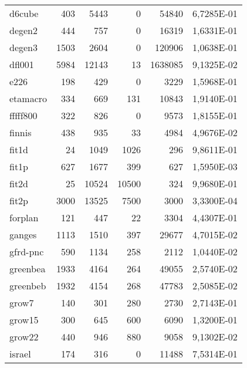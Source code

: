 {\begin{longtable}{>{\ttfamily}lrrrrc}
d6cube       		& 403       & 5443      & 0           & 54840    & \num{6,7285E-01} \\
degen2       		& 444       & 757       & 0           & 16319    & \num{1,6331E-01} \\
degen3       		& 1503      & 2604      & 0           & 120906   & \num{1,0638E-01} \\
dfl001       		& 5984      & 12143     & 13          & 1638085  & \num{9,1325E-02} \\
e226         		& 198       & 429       & 0           & 3229     & \num{1,5968E-01} \\
etamacro     		& 334       & 669       & 131         & 10843    & \num{1,9140E-01} \\
fffff800     		& 322       & 826       & 0           & 9573     & \num{1,8155E-01} \\
finnis       		& 438       & 935       & 33          & 4984     & \num{4,9676E-02} \\
fit1d        		& 24        & 1049      & 1026        & 296      & \num{9,8611E-01} \\
fit1p        		& 627       & 1677      & 399         & 627      & \num{1,5950E-03} \\
fit2d        		& 25        & 10524     & 10500       & 324      & \num{9,9680E-01} \\
fit2p        		& 3000      & 13525     & 7500        & 3000     & \num{3,3300E-04} \\
forplan      		& 121       & 447       & 22          & 3304     & \num{4,4307E-01} \\
ganges       		& 1113      & 1510      & 397         & 29677    & \num{4,7015E-02} \\
gfrd-pnc     		& 590       & 1134      & 258         & 2112     & \num{1,0440E-02} \\
greenbea     		& 1933      & 4164      & 264         & 49055    & \num{2,5740E-02} \\
greenbeb     		& 1932      & 4154      & 268         & 47783    & \num{2,5085E-02} \\
grow7        		& 140       & 301       & 280         & 2730     & \num{2,7143E-01} \\
grow15       		& 300       & 645       & 600         & 6090     & \num{1,3200E-01} \\
grow22       		& 440       & 946       & 880         & 9058     & \num{9,1302E-02} \\
israel       		& 174       & 316       & 0           & 11488    & \num{7,5314E-01} \\

\end{longtable}}
